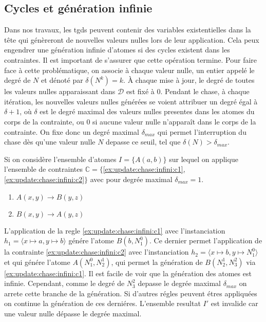 \subsection{Cycles et génération infinie}
\label{sec:update:chase:infini}
Dans nos travaux, les \glspl{tgd} peuvent contenir des variables existentielles dans la tête qui génèreront de nouvelles valeurs nulles lors de leur application.
Cela peux engendrer une génération infinie d'atomes si des cycles existent dans les contraintes.
Il est important de s'assurer que cette opération termine.
Pour faire face à cette problématique, on associe à chaque valeur nulle, un entier appelé le degré de $N$ et dénoté par $\delta(N^k) = k$.
À chaque mise à jour, le degré de toutes les valeurs nulles apparaissant dans $\mathcal{D}$ est fixé à $0$.
Pendant le \gls{chase}, à chaque itération, les nouvelles valeurs nulles générées se voient attribuer un degré égal à $\delta + 1$, où $\delta$ est le degré maximal des valeurs nulles presentes dans les atomes du corps de la contrainte, ou $0$ si aucune valeur nulle n'apparaît dans le corps de la contrainte.
On fixe donc un degré maximal $\delta_{max}$ qui permet l'interruption du \gls{chase} dès qu'une valeur nulle $N$ depasse ce seuil, tel que $\delta(N) > \delta_{max}$.

\begin{example}
    \label{ex:update:chase:infini}
    Si on considère l'ensemble d'atomes $I = \{A(a, b)\}$ sur lequel on applique l'ensemble de contraintes $\mathbb{C} = \{$\ref{ex:update:chase:infini:c1}, \ref{ex:update:chase:infini:c2}$\}$ avec pour degrée maximal $\delta_{max} = 1$.
    \begin{multicols}{2}
        \begin{enumerate}[label=\textbf{$c_\arabic*$ :},ref=$c_\arabic*$]
            \centering
            \item $A(x, y) \to B(y, z)$ \label{ex:update:chase:infini:c1}
            \item $B(x, y) \to A(y, z)$ \label{ex:update:chase:infini:c2}
        \end{enumerate}
    \end{multicols}

    L'application de la regle \ref{ex:update:chase:infini:c1} avec l'instanciation $h_1 = \langle x \mapsto a, y \mapsto b \rangle$ génére l'atome $B(b, N_1^0)$.
    Ce dernier permet l'application de la contrainte \ref{ex:update:chase:infini:c2} avec l'instanciation $h_2 = \langle x \mapsto b, y \mapsto N_1^0 \rangle$ et qui génére l'atome $A(N_1^0, N_2^1)$, qui permet la génération de $B(N_2^1, N_3^2)$ via \ref{ex:update:chase:infini:c1}.
    Il est facile de voir que la génération des atomes est infinie.
    Cependant, comme le degré de $N_3^2$ depasse le degrée maximal $\delta_{max}$ on arrete cette branche de la génération.
    Si d'autres régles peuvent étres appliquées on continue la génération de ces derniéres.
    L'ensemble resultat $I'$ est invalide car une valeur nulle dépasse le degrée maximal.
\end{example}

